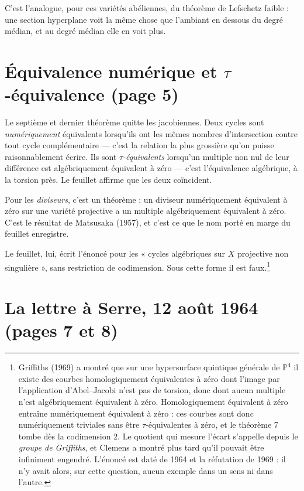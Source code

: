 \documentclass[11pt,a4paper]{article}
\begin{document}
C'est l'analogue, pour ces variétés abéliennes, du théorème de Lefschetz
faible : une section hyperplane voit la même chose que l'ambiant en dessous du
degré médian, et au degré médian elle en voit plus.

\section*{Équivalence numérique et $\tau$-équivalence (page 5)}

Le septième et dernier théorème quitte les jacobiennes. Deux cycles sont
\emph{numériquement} équivalents lorsqu'ils ont les mêmes nombres
d'intersection contre tout cycle complémentaire — c'est la relation la plus
grossière qu'on puisse raisonnablement écrire. Ils sont
\emph{$\tau$-équivalents} lorsqu'un multiple non nul de leur différence est
algébriquement équivalent à zéro — c'est l'équivalence algébrique, à la torsion
près. Le feuillet affirme que les deux coïncident.

Pour les \emph{diviseurs}, c'est un théorème : un diviseur numériquement
équivalent à zéro sur une variété projective a un multiple algébriquement
équivalent à zéro. C'est le résultat de Matsusaka (1957), et c'est ce que le
nom porté en marge du feuillet enregistre.

Le feuillet, lui, écrit l'énoncé pour les « cycles algébriques sur $X$
projective non singulière », sans restriction de codimension. Sous cette forme
il est faux.\footnote{Griffiths (1969) a montré que sur une hypersurface
quintique générale de $\mathbb{P}^{4}$ il existe des courbes homologiquement
équivalentes à zéro dont l'image par l'application d'Abel--Jacobi n'est pas de
torsion, donc dont aucun multiple n'est algébriquement équivalent à zéro.
Homologiquement équivalent à zéro entraîne numériquement équivalent à zéro : ces
courbes sont donc numériquement triviales sans être $\tau$-équivalentes à zéro,
et le théorème 7 tombe dès la codimension $2$. Le quotient qui mesure l'écart
s'appelle depuis le \emph{groupe de Griffiths}, et Clemens a montré plus tard
qu'il pouvait être infiniment engendré. L'énoncé est daté de 1964 et la
réfutation de 1969 : il n'y avait alors, sur cette question, aucun exemple dans
un sens ni dans l'autre.}

\section*{La lettre à Serre, 12 août 1964 (pages 7 et 8)}
\end{document}
